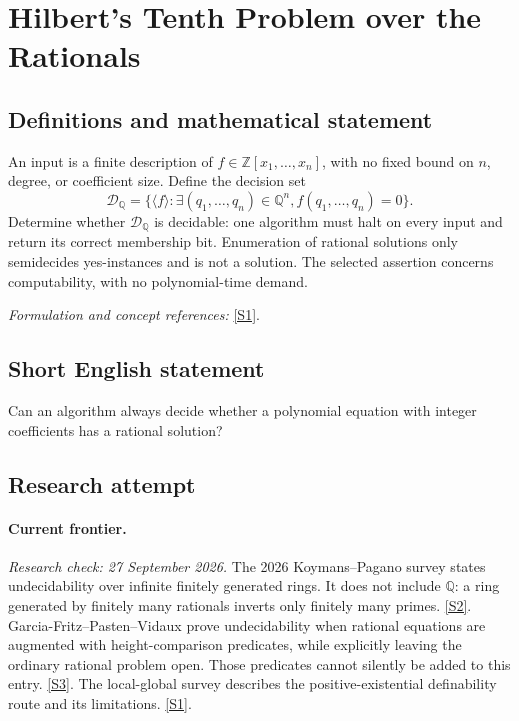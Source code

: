 \documentclass[11pt,a4paper]{article}
\newcommand{\Z}{\mathbb{Z}}
\newcommand{\Q}{\mathbb{Q}}
\newcommand{\sref}[2]{\hyperlink{source:#1:#2}{[S#2]}}
\newif\ifshowcatalogue
\newcommand{\cataloguescope}[1]{\ifshowcatalogue
 \paragraph{Exact scope in the supplied catalogue.}
 \begin{quote}\small #1\end{quote}\fi}
\begin{document}
\setcounter{section}{0}
\clearpage
\section*{\texorpdfstring{Hilbert's Tenth Problem over the Rationals}{Hilbert's Tenth Problem over the Rationals}}\label{30006684}
\subsection{Definitions and mathematical statement}
An input is a finite description of $f\in\Z[x_1,\ldots,x_n]$, with no fixed bound on $n$, degree, or coefficient size. Define the decision set
\[
 \mathcal D_{\Q}=\{\langle f\rangle:\exists(q_1,\ldots,q_n)\in\Q^n,
                                  f(q_1,\ldots,q_n)=0\}.
\]
Determine whether $\mathcal D_{\Q}$ is decidable: one algorithm must halt on every input and return its correct membership bit. Enumeration of rational solutions only semidecides yes-instances and is not a solution. The selected assertion concerns computability, with no polynomial-time demand.
\par\smallskip\textit{Formulation and concept references:} \sref{30006684}{1}.
\cataloguescope{There exists a total algorithm which, given any finite encoding of a multivariate polynomial f in Z[x\_1,...,x\_n] with arbitrary finite n and integer coefficients, halts and correctly decides whether there is q in Q\textasciicircum{}n with f(q)=0. Standard computably interconvertible polynomial encodings are equivalent; no uniform running-time complexity bound is part of the assertion.}
\subsection{Short English statement}
Can an algorithm always decide whether a polynomial equation with integer coefficients has a rational solution?
\subsection{Research attempt}
\paragraph{Current frontier.}
\textit{Research check: 27 September 2026.}
The 2026 Koymans--Pagano survey states undecidability over infinite
finitely generated rings. It does not include $\Q$: a ring generated by
finitely many rationals inverts only finitely many primes. \sref{30006684}{2}.
Garcia-Fritz--Pasten--Vidaux prove undecidability when rational equations
are augmented with height-comparison predicates, while explicitly leaving
the ordinary rational problem open. Those predicates cannot silently be
added to this entry. \sref{30006684}{3}.
The local-global survey describes the positive-existential definability
route and its limitations. \sref{30006684}{1}.
\end{document}
